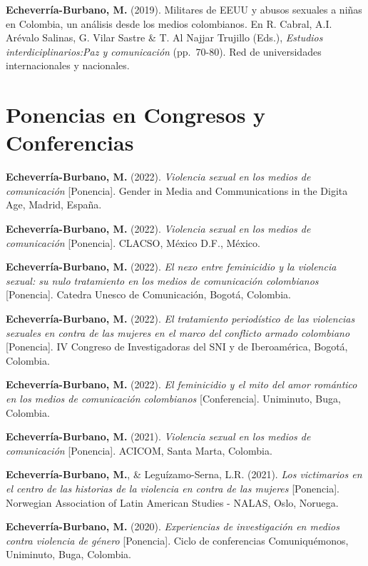 \documentclass[11pt,a4paper,]{awesome-cv}
\begin{document}
\textbf{Echeverría-Burbano, M.} (2019). Militares de EEUU y abusos
sexuales a niñas en Colombia, un análisis desde los medios colombianos.
En R. Cabral, A.I. Arévalo Salinas, G. Vilar Sastre \& T. Al Najjar
Trujillo (Eds.), \emph{Estudios interdiciplinarios:Paz y comunicación}
(pp.~70-80). Red de universidades internacionales y nacionales.

\endgroup

\hypertarget{ponencias-en-congresos-y-conferencias}{%
\section{Ponencias en Congresos y
Conferencias}\label{ponencias-en-congresos-y-conferencias}}

\begingroup
\setlength{\parindent}{-0.5in}
\setlength{\leftskip}{0.5in}

\textbf{Echeverría-Burbano, M.} (2022). \emph{Violencia sexual en los
medios de comunicación} {[}Ponencia{]}. Gender in Media and
Communications in the Digita Age, Madrid, España.

\textbf{Echeverría-Burbano, M.} (2022). \emph{Violencia sexual en los
medios de comunicación} {[}Ponencia{]}. CLACSO, México D.F., México.

\textbf{Echeverría-Burbano, M.} (2022). \emph{El nexo entre feminicidio
y la violencia sexual: su nulo tratamiento en los medios de comunicación
colombianos} {[}Ponencia{]}. Catedra Unesco de Comunicación, Bogotá,
Colombia.

\textbf{Echeverría-Burbano, M.} (2022). \emph{El tratamiento
periodístico de las violencias sexuales en contra de las mujeres en el
marco del conflicto armado colombiano} {[}Ponencia{]}. IV Congreso de
Investigadoras del SNI y de Iberoamérica, Bogotá, Colombia.

\textbf{Echeverría-Burbano, M.} (2022). \emph{El feminicidio y el mito
del amor romántico en los medios de comunicación colombianos}
{[}Conferencia{]}. Uniminuto, Buga, Colombia.

\textbf{Echeverría-Burbano, M.} (2021). \emph{Violencia sexual en los
medios de comunicación} {[}Ponencia{]}. ACICOM, Santa Marta, Colombia.

\textbf{Echeverría-Burbano, M.}, \& Leguízamo-Serna, L.R. (2021).
\emph{Los victimarios en el centro de las historias de la violencia en
contra de las mujeres} {[}Ponencia{]}. Norwegian Association of Latin
American Studies - NALAS, Oslo, Noruega.

\textbf{Echeverría-Burbano, M.} (2020). \emph{Experiencias de
investigación en medios contra violencia de género} {[}Ponencia{]}.
Ciclo de conferencias Comuniquémonos, Uniminuto, Buga, Colombia.
\end{document}
